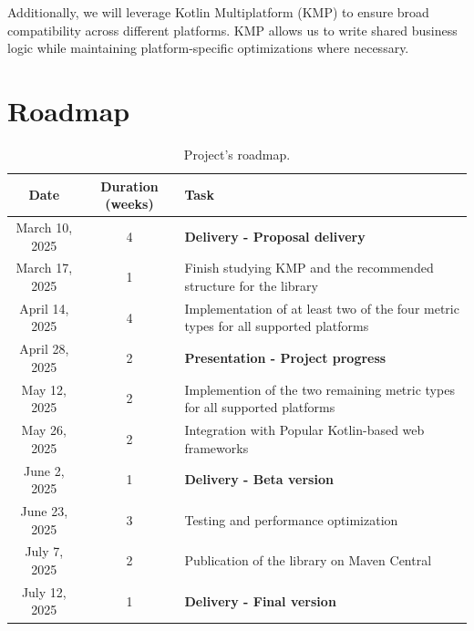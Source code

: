 \documentclass[a4paper,twoside,11pt]{article}
\begin{document}
Additionally, we will leverage Kotlin Multiplatform (KMP) to ensure broad compatibility across different platforms. KMP allows us to write shared business logic while maintaining platform-specific optimizations where necessary.

\section{Roadmap}
\begin{table}[h!]
\centering
\renewcommand{\arraystretch}{1.3}
\begin{tabular}{ |c|c|m{10cm}|  }
  \hline
  \textbf{Date} &\textbf{Duration (weeks)} &\textbf{Task}\\
  \hline
  March 10, 2025   & 4 & \textbf{Delivery - Proposal delivery}\\
  \hline
  March 17, 2025  & 1 & Finish studying KMP and the recommended structure for the library \\
  \hline
  April 14, 2025  & 4 &Implementation of at least two of the four metric types for all supported platforms\\
  \hline
  April 28, 2025 & 2 &   \textbf{Presentation - Project progress}\\
  \hline
  May 12, 2025 & 2 &   Implemention of the two remaining metric types for all supported platforms\\
  \hline
  May 26, 2025 & 2 &   Integration with Popular Kotlin-based web frameworks\\
  \hline
  June 2, 2025 & 1 &\textbf{Delivery - Beta version}\\
  \hline
  June 23, 2025 & 3 &Testing and performance optimization\\
  \hline
  July 7, 2025 & 2 &Publication of the library on Maven Central\\
  \hline
  July 12, 2025    & 1 &\textbf{Delivery - Final version}\\
  \hline
 \end{tabular}
 \caption{Project's roadmap.}
 \label{table:2}
\end{table}
\FloatBarrier



\end{document}
